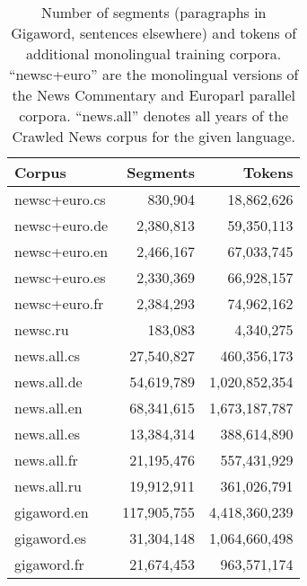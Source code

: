 \documentclass[11pt,letterpaper]{article}
\begin{document}
\begin{table}[htbl]
\begin{center}
\begin{tabular}{l | r r}
Corpus & Segments & Tokens\\
\hline
newsc+euro.cs & 830,904 & 18,862,626\\
newsc+euro.de & 2,380,813 & 59,350,113\\
newsc+euro.en & 2,466,167 & 67,033,745\\
newsc+euro.es & 2,330,369 & 66,928,157\\
newsc+euro.fr & 2,384,293 & 74,962,162\\
newsc.ru & 183,083 & 4,340,275\\
news.all.cs & 27,540,827 & 460,356,173\\
news.all.de & 54,619,789 & 1,020,852,354\\
news.all.en & 68,341,615 & 1,673,187,787\\
news.all.es & 13,384,314 & 388,614,890\\
news.all.fr & 21,195,476 & 557,431,929\\
news.all.ru & 19,912,911 & 361,026,791\\
gigaword.en & 117,905,755 & 4,418,360,239\\
gigaword.es & 31,304,148 & 1,064,660,498\\
gigaword.fr & 21,674,453 & 963,571,174\\
\end{tabular}
\end{center}
\caption{Number of segments (paragraphs in Gigaword, sentences elsewhere) and tokens of additional monolingual training corpora. ``newsc+euro'' are the monolingual versions of the News Commentary and Europarl parallel corpora. ``news.all'' denotes all years of the Crawled News corpus for the given language.}
\label{tab:mono}
\end{table}
\end{document}
